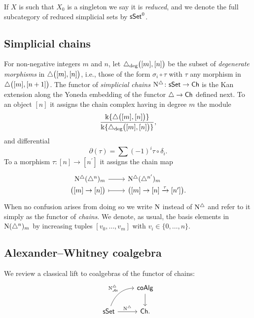 If $X$ is such that $X_0$ is a singleton we say it is \textit{reduced}, and we denote the full subcategory of reduced simplicial sets by $\mathsf{sSet}^0$.

\subsection{Simplicial chains} \label{ss:simplicial sets}

For non-negative integers $m$ and $n$, let $\triangle_{\deg} \big( [m], [n] \big)$ be the subset of \textit{degenerate morphisms} in $\triangle \big( [m], [n] \big)$, i.e., those of the form $\sigma_i \circ \tau$ with $\tau$ any morphism in $\triangle \big( [m], [n+1] \big)$.
The functor of \textit{simplicial chains} $\operatorname{N^{\triangle}} \colon \mathsf{sSet} \to \mathsf{Ch}$ is the Kan extension along the Yoneda embedding of the functor $\triangle \to \mathsf{Ch}$ defined next.
To an object $[n]$ it assigns the chain complex having in degree $m$ the module
\[
\frac{\Bbbk\{\triangle \big( [m], [n] \big) \}}{\Bbbk\{\triangle_{\deg} \big( [m], [n] \big) \}},
\]
and differential
\[
\partial(\tau) = \sum (-1)^i \tau \circ \delta_i.
\]
To a morphism $\tau \colon [n] \to [n^\prime]$ it assigns the chain map
\[
\begin{tikzcd}[row sep=-3pt, column sep=normal,
/tikz/column 1/.append style={anchor=base east},
/tikz/column 2/.append style={anchor=base west}]
\schains(\simplex^n)_m \arrow[r] &  \schains(\simplex^{n^\prime})_m \\
\big( [m] \to [n] \big) \arrow[r, mapsto] & \big( [m] \to [n] \xra{\tau} [n^\prime] \big).
\end{tikzcd}
\]
When no confusion arises from doing so we write $\operatorname{N}$ instead of $\operatorname{N^{\triangle}}$ and refer to it simply as the functor of \textit{chains}.
We denote, as usual, the basis elements in $\operatorname{N}(\triangle^n)_m$ by increasing tuples $[v_0, \dots, v_m]$ with $v_i \in \{0, \dots, n\}$.

\subsection{Alexander--Whitney coalgebra} \label{ss:aw coalgebra}

We review a classical lift to coalgebras of the functor of chains:
\[
\begin{tikzcd}
& \coAlg \arrow[d] \\
\sSet \arrow[r, "\schains"] \arrow[ur, "\schainsAS", out=70, in=180] & \Ch.
\end{tikzcd}
\]

